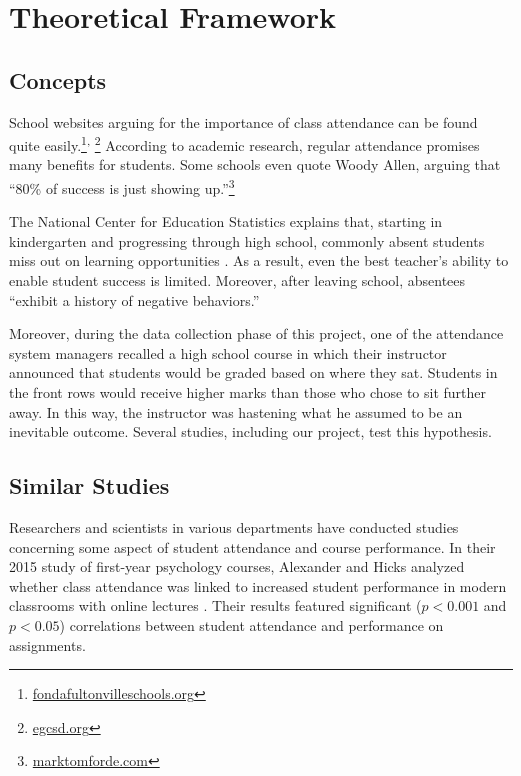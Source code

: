 \section{Theoretical Framework}
\subsection{Concepts}
School websites arguing for the importance of class attendance can be found quite easily.\footnote{\href{https://www.fondafultonvilleschools.org/academics/attendance-and-academic-performance/}{fondafultonvilleschools.org}}\textsuperscript{, }\footnote{\href{https://egcsd.org/academics/attendancematters/}{egcsd.org}} According to academic research, regular attendance promises many benefits for students. Some schools even quote Woody Allen, arguing that ``80\% of success is just showing up.''\footnote{\href{https://marktomforde.com/academic/undergraduates/AttendingClass.html}{marktomforde.com}}

The National Center for Education Statistics explains that, starting in kindergarten and progressing through high school, commonly absent students miss out on learning opportunities \cite{nces2009}. As a result, even the best teacher's ability to enable student success is limited. Moreover, after leaving school, absentees ``exhibit a history of negative behaviors.''

Moreover, during the data collection phase of this project, one of the attendance system managers recalled a high school course in which their instructor announced that students would be graded based on where they sat. Students in the front rows would receive higher marks than those who chose to sit further away. In this way, the instructor was hastening what he assumed to be an inevitable outcome. Several studies, including our project, test this hypothesis.

\subsection{Similar Studies}
Researchers and scientists in various departments have conducted studies concerning some aspect of student attendance and course performance. In their 2015 study of first-year psychology courses, Alexander and Hicks analyzed whether class attendance was linked to increased student performance in modern classrooms with online lectures \cite{alexander2016}. Their results featured significant ($p<0.001$ and $p<0.05$) correlations between student attendance and performance on assignments.

